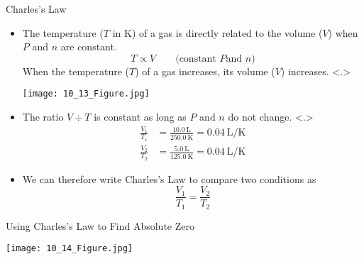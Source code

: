 \documentclass[notes=hide]{beamer}
\begin{document}

\begin{frame}[t]{Charles's Law}
		\begin{itemize}[<+->]
			\item The temperature ($T$ in \si{\kelvin}) of a gas is
				\alert{directly} related to the volume ($V$) when
				$P$ and $n$ are constant.
				\begin{equation*}
					T \propto V \qquad \text{(constant $P$
					and $n$)}
				\end{equation*}
				When the temperature ($T$) of a gas increases,
				its volume ($V$) increases.
				\only<.>{
					\bigskip
	
					\begin{center}
						\texttt{[image: 10\_13\_Figure.jpg]}
					\end{center}
				}
			\item 	The ratio $V \div T$ is \alert{constant} as long as $P$
				and $n$ \alert{do not change}.
				\only<.>{%
				\begin{align*}
					\frac{V_1}{T_1} &=
					\frac{\SI{10.0}{\liter}}{\SI{250.0}{\kelvin}}
					= \SI{0.04}{\liter\per\kelvin} \\
					\frac{V_2}{T_2} &=
					\frac{\SI{5.0}{\liter}}{\SI{125.0}{\kelvin}}
					= \SI{0.04}{\liter\per\kelvin}
			\end{align*}}
			\item We can therefore write Charles's Law to compare two
				conditions as
				\begin{equation*}
					\frac{V_1}{T_1} = \frac{V_2}{T_2}
				\end{equation*}
		\end{itemize}
\end{frame}

\begin{frame}{Using Charles's Law to Find Absolute Zero}
	\begin{center}
		\texttt{[image: 10\_14\_Figure.jpg]}
	\end{center}
\end{frame}

\end{document}
